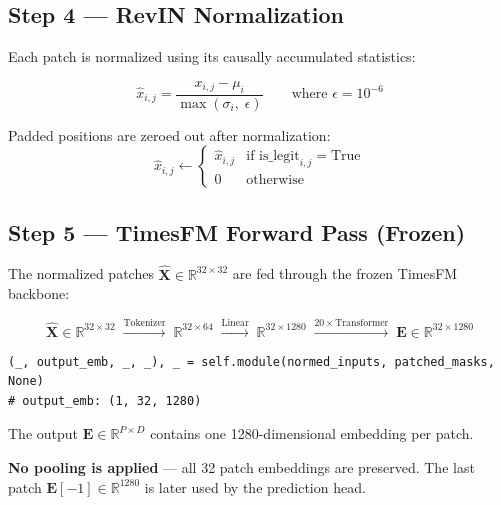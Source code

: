 \documentclass[11pt,a4paper]{article}
\begin{document}
\subsection{Step 4 --- RevIN Normalization}

Each patch is normalized using its causally accumulated statistics:

\begin{equation}
\hat{x}_{i,j} = \frac{x_{i,j} - \mu_i}{\max(\sigma_i,\; \epsilon)}
\qquad \text{where } \epsilon = 10^{-6}
\label{eq:revin}
\end{equation}

Padded positions are zeroed out after normalization:
\[
\hat{x}_{i,j} \leftarrow
\begin{cases}
\hat{x}_{i,j} & \text{if } \text{is\_legit}_{i,j} = \text{True} \\
0 & \text{otherwise}
\end{cases}
\]

\subsection{Step 5 --- TimesFM Forward Pass (Frozen)}

The normalized patches $\hat{\mathbf{X}} \in \mathbb{R}^{32 \times 32}$ are fed through the frozen TimesFM backbone:

\[
\hat{\mathbf{X}} \in \mathbb{R}^{32 \times 32}
\;\xrightarrow{\text{Tokenizer}}\;
\mathbb{R}^{32 \times 64}
\;\xrightarrow{\text{Linear}}\;
\mathbb{R}^{32 \times 1280}
\;\xrightarrow{20\times \text{Transformer}}\;
\mathbf{E} \in \mathbb{R}^{32 \times 1280}
\]

\begin{lstlisting}
(_, output_emb, _, _), _ = self.module(normed_inputs, patched_masks, None)
# output_emb: (1, 32, 1280)
\end{lstlisting}

\noindent
The output $\mathbf{E} \in \mathbb{R}^{P \times D}$ contains one 1280-dimensional embedding per patch.

\textbf{No pooling is applied} --- all 32 patch embeddings are preserved. The last patch $\mathbf{E}[-1] \in \mathbb{R}^{1280}$ is later used by the prediction head.
\end{document}
